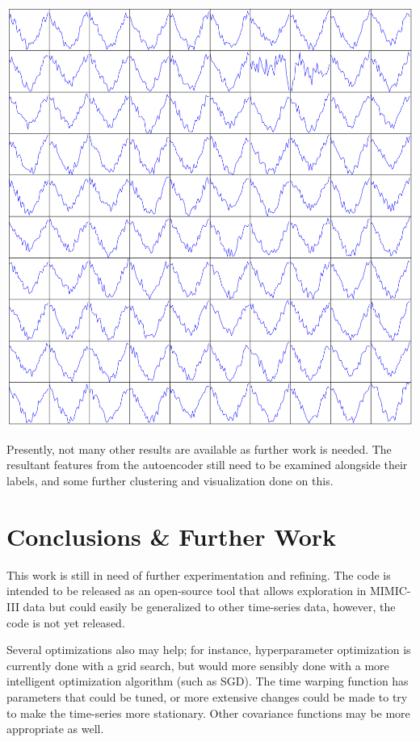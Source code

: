 \documentclass[journal]{IEEEtran}
\begin{document}
\includegraphics[width=\linewidth]{keras_1st_layer.png}

Presently, not many other results are available as further work is
needed.  The resultant features from the autoencoder still need to be
examined alongside their labels, and some further clustering and
visualization done on this.

\section{Conclusions \& Further Work}

This work is still in need of further experimentation and refining.
The code is intended to be released as an open-source tool that allows
exploration in MIMIC-III data but could easily be generalized to other
time-series data, however, the code is not yet released.

Several optimizations also may help; for instance, hyperparameter
optimization is currently done with a grid search, but would more
sensibly done with a more intelligent optimization algorithm (such as
SGD).  The time warping function has parameters that could be tuned,
or more extensive changes\cite{Lasko2015} could be made to try to make
the time-series more stationary.  Other covariance functions may be
more appropriate as well.
\end{document}
